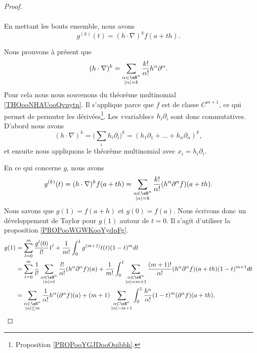 \begin{proof}
\begin{subproof}
\begin{subequations}
\begin{align}
			\end{align}
		\end{subequations}
		En mettant les bouts ensemble, nous avons
		\begin{equation}
			g^{(k)}(t)=(h\cdot\nabla)^kf(a+th).
		\end{equation}
	\end{subproof}
	Nous prouvons à présent que
	\begin{equation}		\label{EQooTBDVooBsguqP}
		(h\cdot \nabla)^k=\sum_{\substack{ \alpha\in \eN^n \\ | \alpha |=k }  }\frac{ k! }{ \alpha! }h^{\alpha}\partial^{\alpha}.
	\end{equation}
	Pour cela nous nous souvenons du théorème multinomial \ref{THOooNHAUooQvuytn}. Il s'applique parce que \( f\) est de classe \( C^{m+1}\), ce qui permet de permuter les dérivées\footnote{Proposition \ref{PROPooYGJDooOqibbh}.}. Les «variables» \( h_i\partial_i\) sont donc commutatives. D'abord nous avons
	\begin{equation}
		(h\cdot\nabla)^k=\big( \sum_ih_i\partial_i \big)^k=(h_1\partial_1+\ldots+h_n\partial_n)^k,
	\end{equation}
	et ensuite nous appliquons le théorème multinomial avec \( x_i=h_i\partial_i\).

	En ce qui concerne \( g\), nous avons
	\begin{equation}
		g^{(k)}(t)=(h\cdot\nabla)^kf(a+th)=\sum_{\substack{ \alpha\in \eN^n \\ | \alpha |=k }  }\frac{ k! }{ \alpha! }(h^{\alpha}\partial^{\alpha}f)(a+th).
	\end{equation}
	Nous savons que \( g(1)=f(a+h)\) et \( g(0)=f(a)\). Nous écrivons donc un développement de Taylor pour \( g(1) \) autour de \( t=0\). Il s'agit d'utiliser la proposition \ref{PROPooWGWKooYydpFg}.
	\begin{subequations}
		\begin{align}
			g(1) & =\sum_{l=0}^m\frac{ g^{l}(0) }{ l! }1^l+\frac{1}{ m!}\int_0^1g^{(m+1)}t(t)(1-t)^mdt \\
			     & =\sum_{l=0}^m\frac{1}{ l!}\sum_{\substack{ \alpha\in \eN^n                          \\ | \alpha |=l }  }\frac{ l! }{ \alpha! }(h^{\alpha}\partial^{\alpha}f)(a)+\frac{1}{ m!}\int_0^1\sum_{\substack{ \alpha\in \eN^n \\ | \alpha |=m+1 }  }\frac{ (m+1)! }{ \alpha! }(h^{\alpha}\partial^{\alpha}f)(a+th)(1-t)^{m+1}dt\\
			     & =\sum_{\substack{ \alpha\in\eN^n                                                    \\ | \alpha |\leq m }  }\frac{1}{ \alpha!}h^{\alpha}(\partial^{\alpha}f)(a)+(m+1)\sum_{\substack{ \alpha\in \eN^n \\ | \alpha |=m+1 }  }\int_0^1\frac{ h^{\alpha} }{ \alpha! }(1-t)^m(\partial^{\alpha}f)(a+th).
		\end{align}
	\end{subequations}
\end{proof}


